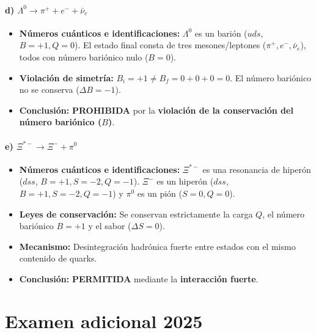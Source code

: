 \begin{problema}
\paragraph{d) $\Lambda^0 \rightarrow \pi^+ + e^- + \bar{\nu}_e$}
\begin{itemize}
    \item \textbf{Números cuánticos e identificaciones:} 
    $\Lambda^0$ es un barión ($uds$, $B = +1, Q = 0$). 
    El estado final consta de tres mesones/leptones ($\pi^+, e^-, \bar{\nu}_e$), todos con número bariónico nulo ($B = 0$).
    \item \textbf{Violación de simetría:} $B_i = +1 \neq B_f = 0 + 0 + 0 = 0$. El número bariónico no se conserva ($\Delta B = -1$).
    \item \textbf{Conclusión:} \textbf{PROHIBIDA} por la \textbf{violación de la conservación del número bariónico ($B$)}.
\end{itemize}

\paragraph{e) $\Xi^{*-} \rightarrow \Xi^- + \pi^0$}
\begin{itemize}
    \item \textbf{Números cuánticos e identificaciones:} 
    $\Xi^{*-}$ es una resonancia de hiperón ($dss$, $B = +1, S = -2, Q = -1$). 
    $\Xi^-$ es un hiperón ($dss$, $B = +1, S = -2, Q = -1$) y $\pi^0$ es un pión ($S = 0, Q = 0$).
    \item \textbf{Leyes de conservación:} Se conservan estrictamente la carga $Q$, el número bariónico $B = +1$ y el sabor ($\Delta S = 0$).
    \item \textbf{Mecanismo:} Desintegración hadrónica fuerte entre estados con el mismo contenido de quarks.
    \item \textbf{Conclusión:} \textbf{PERMITIDA} mediante la \textbf{interacción fuerte}.
\end{itemize}
\end{problema}

\newpage
\section{Examen adicional 2025}
\setcounter{problemacontador}{0}

